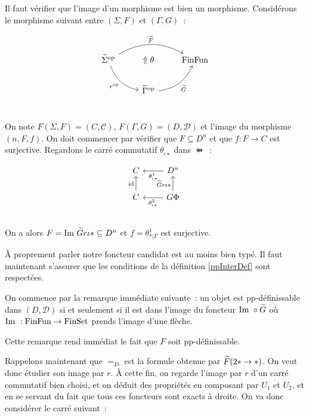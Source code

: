 \begin{pv}
    Il faut vérifier que l'image d'un morphisme est bien un morphisme. Considérons le
    morphisme suivant entre $(\Sigma,F)$ et $(\Gamma,G)$~:

    \[\begin{tikzcd}
        \tsigma^\op\arrow[dr, bend right, swap, "r^\op"]\arrow[rr, bend left, "\tf"]
            & \Uparrow\theta
            & \ffun \\
        & \tgamma^\op\arrow[ur, bend right, swap, "\tg"] \\
    \end{tikzcd}\]

    On note $F(\Sigma,F) = (C,\mathcal{C})$, $F(\Gamma,G) = (D,\mathcal{D})$ et l'image
    du morphisme $(n, F, f)$. On doit commencer par vérifier que $F\subseteq D^n$ et
    que $f : F\rightarrow C$ est surjective. Regardons le carré commutatif
    $\theta_{\iota\star}$ dans $\ffun$~:

    \[\begin{tikzcd}
        C & D^n\arrow[l, "\theta^1_{\iota\ast}"] \\
        C\arrow[u, "\id"]
            & G\Phi\arrow[u, "\tg r\iota\ast"]\arrow[l, "\theta^2_{\iota\ast}"] \\
    \end{tikzcd}\]

    On a alors $F = \text{Im }\widetilde{G} r\iota\ast\subseteq D^n$ et $f = \theta^1_{\ast|F}$ est
    surjective.

    À proprement parler notre foncteur candidat est au moins bien typé. Il faut
    maintenant s'assurer que les conditions de la définition \ref{ppInterDef}
    sont respectées.

    On commence par la remarque immédiate suivante~: un objet est
    pp-définissable dans $(D,\mathcal{D})$ si et seulement si il est dans
    l'image du foncteur $\text{Im }\circ\widetilde{G}$ où $\text{Im }:\text{FinFun}\rightarrow\text{FinSet}$ prends
    l'image d'une flèche.

    Cette remarque rend immédiat le fait que $F$ soit pp-définissable.

    Rappelons maintenant que $=_D$ est la formule obtenue par $\widetilde{F}(2\ast\rightarrow\ast)$.
    On veut donc étudier son image par $r$. À cette fin, on regarde l'image par
    $r$ d'un carré commutatif bien choisi, et on déduit des propriétés en composant par
    $U_1$ et $U_2$, et en se servant du fait que tous ces foncteurs sont exacts à droite.
    On va donc considérer le carré suivant~:


\end{pv}
